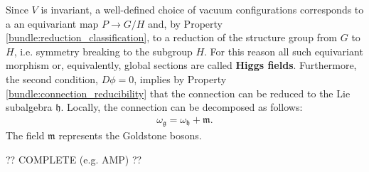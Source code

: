     Since $V$ is invariant, a well-defined choice of vacuum configurations corresponds to a an equivariant map $P\rightarrow G/H$ and, by Property \ref{bundle:reduction_classification}, to a reduction of the structure group from $G$ to $H$, i.e. symmetry breaking to the subgroup $H$. For this reason all such equivariant morphism or, equivalently, global sections are called \textbf{Higgs fields}. Furthermore, the second condition, $D\phi=0$, implies by Property \ref{bundle:connection_reducibility} that the connection can be reduced to the Lie subalgebra $\mathfrak{h}$. Locally, the connection can be decomposed as follows:
    \begin{gather}
        \omega_\mathfrak{g} = \omega_\mathfrak{h} + \mathfrak{m}.
    \end{gather}
    The field $\mathfrak{m}$ represents the Goldstone bosons.

    ?? COMPLETE (e.g. AMP) ??
